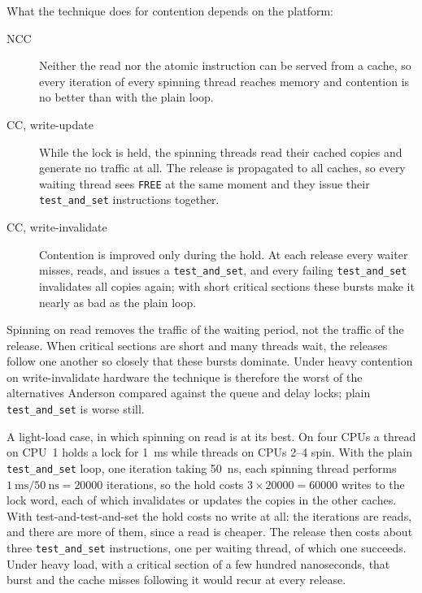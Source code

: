 \documentclass[../main.tex]{subfiles}
\begin{document}
What the technique does for contention depends on the platform:
\begin{description}
  \item[NCC] Neither the read nor the atomic instruction can be served from
    a cache, so every iteration of every spinning thread reaches memory and
    contention is no better than with the plain loop.
  \item[CC, write-update] While the lock is held, the spinning threads read
    their cached copies and generate no traffic at all.  The release is
    propagated to all caches, so every waiting thread sees \texttt{FREE} at
    the same moment and they issue their \texttt{test\_and\_set}
    instructions together.
  \item[CC, write-invalidate] Contention is improved only during the
    hold.  At each release every waiter misses, reads, and issues a
    \texttt{test\_and\_set}, and every failing \texttt{test\_and\_set}
    invalidates all copies again; with short critical sections these
    bursts make it nearly as bad as the plain loop.
\end{description}
Spinning on read removes the traffic of the waiting period, not the traffic
of the release.  When critical sections are short and many threads wait,
the releases follow one another so closely that these bursts dominate.
Under heavy contention on write-invalidate hardware the technique is
therefore the worst of the alternatives Anderson compared against the
queue and delay locks; plain \texttt{test\_and\_set} is worse still.

\begin{example}
  A light-load case, in which spinning on read is at its best.  On four
  CPUs a thread on CPU~1 holds a lock for \SI{1}{\milli\second} while
  threads on CPUs 2--4 spin.  With the plain \texttt{test\_and\_set} loop,
  one iteration taking \SI{50}{\nano\second}, each spinning thread performs
  $\SI{1}{\milli\second}/\SI{50}{\nano\second} = \num{20000}$ iterations,
  so the hold costs $3\times\num{20000} = \num{60000}$ writes to the lock
  word, each of which invalidates or updates the copies in the other
  caches.  With test-and-test-and-set the hold costs no write at all: the
  iterations are reads, and there are more of them, since a read is
  cheaper.  The release then costs about three \texttt{test\_and\_set}
  instructions, one per waiting thread, of which one succeeds.  Under heavy
  load, with a critical section of a few hundred nanoseconds, that burst
  and the cache misses following it would recur at every release.
\end{example}
\end{document}

